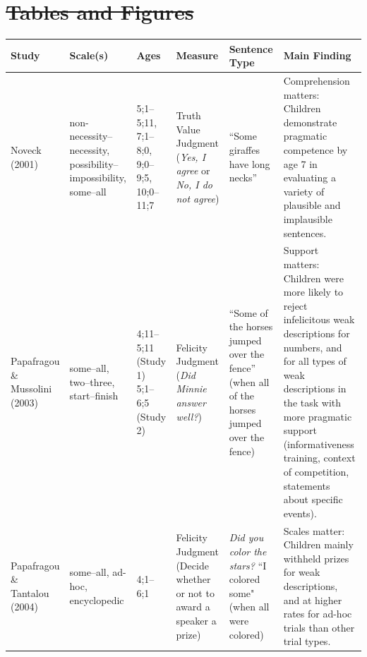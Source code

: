 \documentclass[man]{apa2}
\providecommand{\DIFdel}[1]{{\protect\color{red}\sout{#1}}}                      %
\providecommand{\DIFaddbegin}{} %
\providecommand{\DIFaddend}{} %
\providecommand{\DIFdelbegin}{} %
\providecommand{\DIFdelend}{} %
\begin{document}
{\DIFdelbegin \section{\DIFdel{Tables and Figures}}
\addtocounter{section}{-1}%
\DIFdelend \DIFaddbegin 
\DIFaddend 

\begin{landscape}
\begin{table}[!ht]
\footnotesize
\centering
\begin{tabular}{| p{2.2cm} | p{2cm} | p{1.69cm} | p{4.5cm} | p{5cm} | p{7.2cm} |} \hline
{\bf Study} & {\bf Scale(s)} & {\bf Ages} & {\bf Measure} & {\bf Sentence Type} & {\bf Main Finding} \\ \hline
Noveck (2001) & non-necessity--necessity, possibility--impossibility, some--all & 5;1--5;11, 7;1--8;0, 9;0--9;5, 10;0--11;7 & Truth Value Judgment (\textit{Yes, I agree} or \textit{No, I do not agree}) & ``Some giraffes have long necks'' & \parbox[t]{7.2cm}{Comprehension matters: Children demonstrate\\ pragmatic competence by age 7 in evaluating a variety of plausible and implausible sentences.} \\ \hline
\parbox[t]{2.2cm}{Papafragou \&\\Mussolini (2003)} & \parbox[t]{2cm}{some--all,\\two--three,\\start--finish} & \parbox[t]{1.69cm}{4;11--5;11\\(Study 1)\\5;1--6;5\\(Study 2) } &  \parbox[t]{4.5cm}{Felicity Judgment (\textit{Did Minnie\\answer well?})} & ``Some of the horses jumped over the fence'' (when all of the horses jumped over the fence) & Support matters: Children were more likely to reject infelicitous weak descriptions for numbers, and for all types of weak descriptions in the task with more pragmatic support (informativeness training, context of competition, statements about specific events). \\ \hline
\parbox[t]{2.2cm}{Papafragou \&\\Tantalou (2004)} & some--all, ad-hoc, encyclopedic & 4;1--6;1 & Felicity Judgment (Decide whether or not to award a speaker a prize) & \textit{Did you color the stars?} ``I colored some" (when all were colored) & Scales matter: Children mainly withheld prizes for weak descriptions, and at higher rates for ad-hoc trials than other trial types. \\ \hline

\end{tabular}
\end{table}
\end{landscape}}
\end{document}
